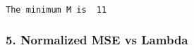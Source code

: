 \documentclass[11pt]{article}
\begin{document}
    \begin{center}
    \end{center}
    { \hspace*{\fill} \\}
    
    \begin{Verbatim}[commandchars=\\\{\}]
The minimum M is  11

    \end{Verbatim}

    \subsubsection{5. Normalized MSE vs
Lambda}\label{normalized-mse-vs-lambda}
\end{document}
